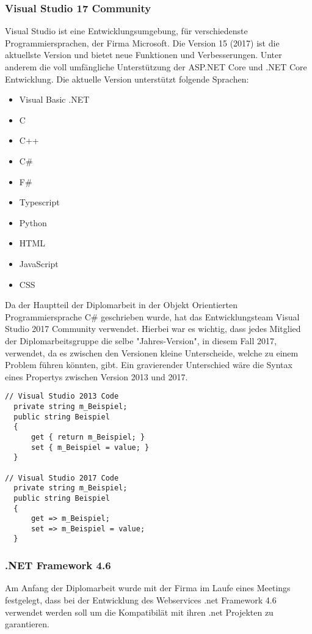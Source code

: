 \subsubsection {Visual Studio 17 Community}
\label{sec:VisualStudio17Community}
Visual Studio ist eine Entwicklungsumgebung, für verschiedenste Programmiersprachen, der Firma Microsoft. Die Version 15 (2017) ist die aktuellste Version und bietet neue Funktionen und Verbesserungen. Unter anderem die voll umfängliche Unterstützung der ASP.NET Core und .NET Core Entwicklung. Die aktuelle Version unterstützt folgende Sprachen:
\begin{itemize}
\item Visual Basic .NET
\item C
\item C++
\item C\#
\item F\#
\item Typescript
\item Python
\item HTML
\item JavaScript
\item CSS
\end{itemize}

Da der Hauptteil der Diplomarbeit in der Objekt Orientierten Programmiersprache C\# geschrieben wurde, hat das Entwicklungsteam Visual Studio 2017 Community verwendet. Hierbei war es wichtig, dass jedes Mitglied der Diplomarbeitsgruppe die selbe "Jahres-Version", in diesem Fall 2017, verwendet, da es zwischen den Versionen kleine Unterscheide, welche zu einem Problem führen könnten, gibt. Ein gravierender Unterschied wäre die Syntax eines Propertys zwischen Version 2013 und 2017. 

\begin{lstlisting}[caption=Syntax Unterschied: Property , label=lst:test]
// Visual Studio 2013 Code
  private string m_Beispiel;
  public string Beispiel
  {
      get { return m_Beispiel; }
      set { m_Beispiel = value; }
  }

// Visual Studio 2017 Code
  private string m_Beispiel;
  public string Beispiel
  {
      get => m_Beispiel;
      set => m_Beispiel = value;
  }
\end{lstlisting}

\subsubsection {.NET Framework 4.6}
\label{sec:.NETFramework4.6}
Am Anfang der Diplomarbeit wurde mit der Firma im Laufe eines Meetings festgelegt, dass bei der Entwicklung des Webservices .net Framework 4.6 verwendet werden soll um die Kompatibilät mit ihren .net Projekten zu garantieren.


